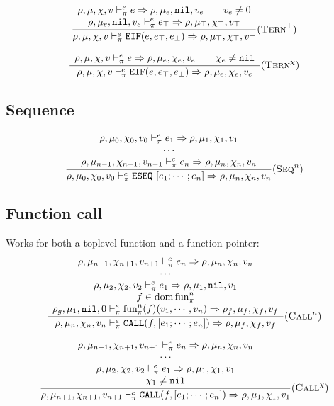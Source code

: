 \[\dfrac{\begin{array}{c}
    \rho,\mu,\chi,v \vdash_\pi^e e\Rightarrow \rho,\mu_e,\texttt{nil},v_e \qquad v_e \ne 0\\
    \rho,\mu_e,\texttt{nil},v_e \vdash_\pi^e e_\top \Rightarrow \rho,\mu_\top,\chi_\top,v_\top \\
\end{array}}{\rho,\mu,\chi,v \vdash_\pi^e \texttt{EIF}(e, e_\top, e_\bot) \Rightarrow \rho,\mu_\top,\chi_\top,v_\top}(\textsc{Tern}^\top)\]

\[\dfrac{\begin{array}{c}
    \rho,\mu,\chi,v \vdash_\pi^e e\Rightarrow \rho,\mu_e,\chi_e,v_e \qquad \chi_e\ne\texttt{nil}
\end{array}}{\rho,\mu,\chi,v \vdash_\pi^e \texttt{EIF}(e, e_\top, e_\bot) \Rightarrow \rho,\mu_e,\chi_e,v_e}(\textsc{Tern}^\chi)\]


\subsection{Sequence}
\[\dfrac{\begin{array}{c}
    \rho,\mu_0,\chi_0,v_0 \vdash_\pi^e e_1 \Rightarrow \rho,\mu_1,\chi_1,v_1 \\
    \cdots \\
    \rho,\mu_{n-1},\chi_{n-1},v_{n-1} \vdash_\pi^e e_n \Rightarrow \rho,\mu_n,\chi_n,v_n \\
\end{array}}{\rho,\mu_0,\chi_0,v_0 \vdash_\pi^e \texttt{ESEQ}\ [e_1;\cdots;e_n] \Rightarrow \rho,\mu_n,\chi_n,v_n} (\textsc{Seq}^n)\]

\subsection{Function call}
Works for both a toplevel function and a function pointer:
\[\dfrac{\begin{array}{c}
    \rho,\mu_{n+1},\chi_{n+1},v_{n+1} \vdash_\pi^e e_n \Rightarrow \rho,\mu_n,\chi_n,v_n \\
    \cdots \\
    \rho,\mu_2,\chi_2,v_2 \vdash_\pi^e e_1 \Rightarrow \rho,\mu_1,\texttt{nil},v_1 \\
    f\in\operatorname{dom}\text{fun}_\pi^n \\
    \rho_g,\mu_1,\texttt{nil},0 \vdash_\pi^e \text{fun}_\pi^n(f)(v_1, \cdots, v_n) \Rightarrow \rho_f,\mu_f,\chi_f,v_f
\end{array}}{\rho,\mu_n,\chi_n,v_n \vdash_\pi^e \texttt{CALL}(f, [e_1; \cdots; e_n]) \Rightarrow \rho,\mu_f,\chi_f,v_f} (\textsc{Call}^n)\]

\[\dfrac{\begin{array}{c}
    \rho,\mu_{n+1},\chi_{n+1},v_{n+1} \vdash_\pi^e e_n \Rightarrow \rho,\mu_n,\chi_n,v_n \\
    \cdots \\
    \rho,\mu_2,\chi_2,v_2 \vdash_\pi^e e_1 \Rightarrow \rho,\mu_1,\chi_1,v_1 \\
    \chi_1\ne\texttt{nil} \\
\end{array}}{\rho,\mu_{n+1},\chi_{n+1},v_{n+1} \vdash_\pi^e \texttt{CALL}(f, [e_1; \cdots; e_n]) \Rightarrow \rho,\mu_1,\chi_1,v_1} (\textsc{Call}^\chi)\]


